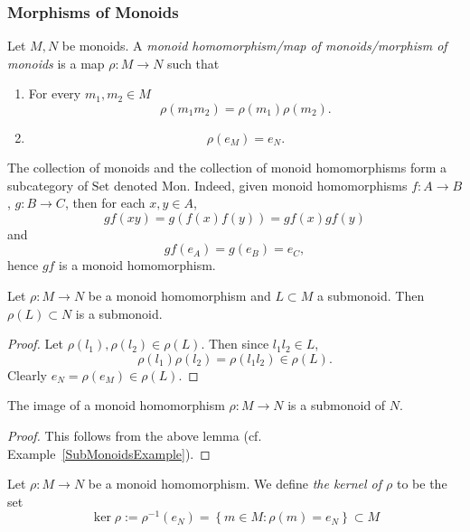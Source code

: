 \subsubsection{Morphisms of Monoids}
\begin{definition}
    Let $M,N$ be monoids. A \emph{monoid homomorphism/map of monoids/morphism of monoids} is a map $\rho : M \rightarrow N$ such that 
    \begin{enumerate}
        \item For every $m_1,m_2\in M$
        $$
            \rho(m_1m_2)=\rho(m_1)\rho(m_2).
        $$
        \item 
        $$
            \rho(e_M) = e_N.
        $$
    \end{enumerate}
\end{definition}
\begin{remark}
    The collection of monoids and the collection of monoid homomorphisms form a subcategory of $\mathrm{Set}$ denoted $\mathrm{Mon}$. Indeed, given monoid homomorphisms $f: A\rightarrow B$, $g:B\rightarrow C$, then for each $x,y\in A$,
    $$
        gf(xy)=g(f(x)f(y))=gf(x)gf(y)
    $$
    and 
    $$
        gf(e_A)=g(e_B)=e_C,
    $$
    hence $gf$ is a monoid homomorphism. 
\end{remark}
\begin{lemma}\label{MonoidHomomorphismImageOfSubmonoidIsSubmonoid}
    Let $\rho : M\rightarrow N$ be a monoid homomorphism and $L\subset M$ a submonoid. Then $\rho(L) \subset N$ is a submonoid.   
\end{lemma}
\begin{proof}
    Let $\rho(l_1),\rho(l_2)\in \rho(L)$. Then since $l_1l_2\in L$,
    $$\rho(l_1)\rho(l_2)=\rho(l_1l_2)\in \rho(L).$$
    Clearly $e_N = \rho(e_M)\in \rho(L)$. 
\end{proof}
\begin{corollary}\label{ImageOfMonoidHomomorphismIsSubmonoid}
    The image of a monoid homomorphism $\rho:M\rightarrow N$ is a submonoid of $N$.
\end{corollary}
\begin{proof}
    This follows from the above lemma (cf. Example~\ref{SubMonoidsExample}). 
\end{proof}
\begin{definition}
    Let $\rho: M\rightarrow N$ be a monoid homomorphism. We define \textit{the kernel of $\rho$} to be the set 
    $$\ker \rho := \rho^{-1}(e_N) =\left\{ m\in M : \rho(m) = e_N\right\}\subset M$$
\end{definition}
